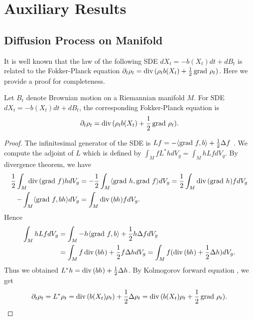 \section{Auxiliary Results}


\subsection{Diffusion Process on Manifold}

It is well known that the law of the following SDE $dX_{t} = - b(X_{t}) dt + dB_{t}$ is related to the Fokker-Planck equation $\partial_{t} \rho_{t} = \operatorname{div\,} (\rho_{t} b(X_{t}) + \frac{1}{2} \operatorname{grad\,} \rho_{t}) $. Here we provide a proof for completeness.
\begin{lemma}\label{Lemma_SDE_F_P}
    Let $B_{t}$ denote Brownian motion on a Riemannian manifold $M$.
    For SDE $dX_{t} = - b(X_{t}) dt + dB_{t}$, the corresponding Fokker-Planck equation is 
    \begin{align*}
        \partial_{t} \rho_{t} = \operatorname{div\,} (\rho_{t} b(X_{t}) + \frac{1}{2} \operatorname{grad\,} \rho_{t}).
    \end{align*}
\end{lemma}

\begin{proof}
    The infinitesimal generator of the SDE is $Lf = - \langle \operatorname{grad\,} f, b \rangle + \frac{1}{2} \Delta f$ \cite{cheng2022efficient}.
    We compute the adjoint of $L$ which is defined by $\int_{M} f L^{*} h dV_{g} = \int_{M} h L f dV_{g}$.
    By divergence theorem, we have 
    \begin{align*}
            \frac{1}{2} \int_{M} \operatorname{div\,} (\operatorname{grad\,} f) h dV_{g}
            &= - \frac{1}{2} \int_{M} \langle \operatorname{grad\,} h, \operatorname{grad\,} f \rangle dV_{g}
            = \frac{1}{2} \int_{M} \operatorname{div\,} (\operatorname{grad\,} h) f dV_{g} \\
            - \int_{M} \langle \operatorname{grad\,} f, b h \rangle dV_{g} &= \int_{M} \operatorname{div\,} (bh) f dV_{g}.
    \end{align*}
    Hence 
    \begin{align*}
            \int_{M} h L f dV_{g}
            &= \int_{M} - h \langle \operatorname{grad\,} f, b \rangle + \frac{1}{2} h \Delta f dV_{g} \\
            &= \int_{M} f \operatorname{div\,} (bh) + \frac{1}{2} f \Delta h dV_{g}
            = \int_{M} f (\operatorname{div\,} (bh) + \frac{1}{2}  \Delta h) dV_{g}.
    \end{align*}
    Thus we obtained $L^{*}h = \operatorname{div\,} (bh) + \frac{1}{2} \Delta h$.
    By Kolmogorov forward equation {\cite[Equation 1.5.2]{bakry2014analysis}}, we get 
    \begin{align*}
        \partial_{t} \rho_{t} 
        = L^{*} \rho_{t}
        = \operatorname{div\,} (b(X_{t})\rho_{t}) + \frac{1}{2} \Delta \rho_{t}
        = \operatorname{div\,} (b(X_{t})\rho_{t} + \frac{1}{2} \operatorname{grad\,} \rho_{t}).
    \end{align*}
\end{proof}

